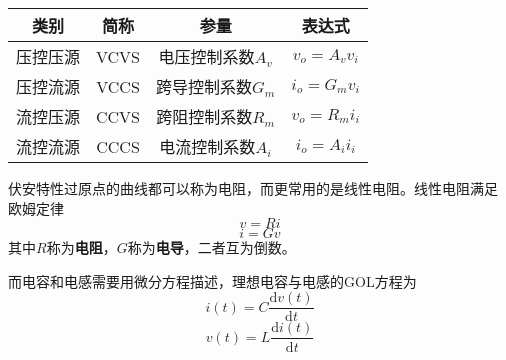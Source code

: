     \begin{center}
        \begin{tabular}{|c|c|c|c|}
        \hline
        \bfseries 类别 & \bfseries 简称 & \bfseries 参量 & \bfseries 表达式 \\
            \hline
            压控压源 & VCVS & 电压控制系数$A_v$ & $v_o=A_v v_i$ \\
            \hline
            压控流源 & VCCS & 跨导控制系数$G_m$ & $i_o=G_m v_i$ \\
            \hline
            流控压源 & CCVS & 跨阻控制系数$R_m$ & $v_o=R_m i_i$ \\
            \hline
            流控流源 & CCCS & 电流控制系数$A_i$ & $i_o=A_i i_i$ \\
            \hline
        \end{tabular}
    \end{center}
    
    \par 伏安特性过原点的曲线都可以称为电阻，而更常用的是线性电阻。线性电阻满足
    欧姆定律
    \[
    v=Ri    
    \]
    \[
    i=Gv    
    \]
    其中$R$称为\textbf{电阻}，$G$称为\textbf{电导}，二者互为倒数。
    \begin{center}
    \end{center}
    \par 而电容和电感需要用微分方程描述，理想电容与电感的GOL方程为
    \[
    i(t)=C\frac{\mathrm{d}v(t)}{\mathrm{d}t}    
    \]
    \[
    v(t)=L\frac{\mathrm{d}i(t)}{\mathrm{d}t}    
    \]
    \begin{center}
    \end{center}
